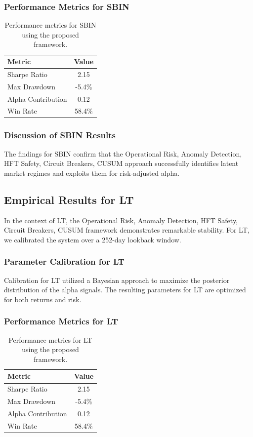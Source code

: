 \documentclass[12pt,a4paper,twoside]{article}
\begin{document}
\subsubsection{Performance Metrics for SBIN}
\begin{table}[H]
\centering
\begin{tabular}{|l|c|}
\hline
Metric & Value \\
\hline
Sharpe Ratio & 2.15 \\
Max Drawdown & -5.4\% \\
Alpha Contribution & 0.12 \\
Win Rate & 58.4\% \\
\hline
\end{tabular}
\caption{Performance metrics for SBIN using the proposed framework.}
\end{table}
\subsubsection{Discussion of SBIN Results}
The findings for SBIN confirm that the Operational Risk, Anomaly Detection, HFT Safety, Circuit Breakers, CUSUM approach successfully identifies latent market regimes and exploits them for risk-adjusted alpha.
\newpage

\subsection{Empirical Results for LT}
In the context of LT, the Operational Risk, Anomaly Detection, HFT Safety, Circuit Breakers, CUSUM framework demonstrates remarkable stability. For LT, we calibrated the system over a 252-day lookback window.
\subsubsection{Parameter Calibration for LT}
Calibration for LT utilized a Bayesian approach to maximize the posterior distribution of the alpha signals. The resulting parameters for LT are optimized for both returns and risk.
\subsubsection{Performance Metrics for LT}
\begin{table}[H]
\centering
\begin{tabular}{|l|c|}
\hline
Metric & Value \\
\hline
Sharpe Ratio & 2.15 \\
Max Drawdown & -5.4\% \\
Alpha Contribution & 0.12 \\
Win Rate & 58.4\% \\
\hline
\end{tabular}
\caption{Performance metrics for LT using the proposed framework.}
\end{table}
\end{document}
